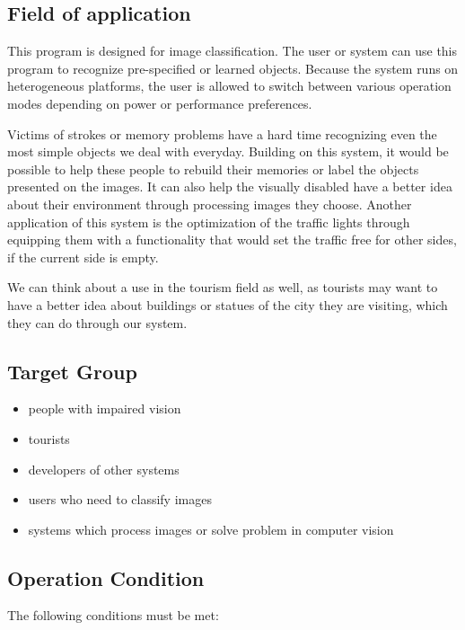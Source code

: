 \documentclass[parskip=full]{scrartcl}
\begin{document}
\subsection{Field of application}
 
This program is designed for image classification. The user or system can use this program to recognize pre-specified or learned objects. Because the system runs on heterogeneous platforms, the user is allowed to switch between various operation modes depending on power or performance preferences.

Victims of strokes or memory problems have a hard time recognizing even the most simple objects we deal with everyday. Building on this system, it would be possible to help these people to rebuild their memories or label the objects presented on the images. It can also help the visually disabled have a better idea about their environment through processing images they choose.
Another application of this system is the optimization of the traffic lights through equipping them with a functionality that would set the traffic free for other sides, if the current side is empty.

We can think about a use in the tourism field as well, as tourists may want to have a better idea about buildings or statues of the city they are visiting, which they can do through our system.

\subsection{Target Group}

\begin{itemize}
	\item people with impaired vision
	\item tourists
	\item developers of other systems
	\item users who need to classify images
	\item systems which process images or solve problem in computer vision
\end{itemize}

\pagebreak



\subsection{Operation Condition}

The following conditions must be met:
\end{document}
